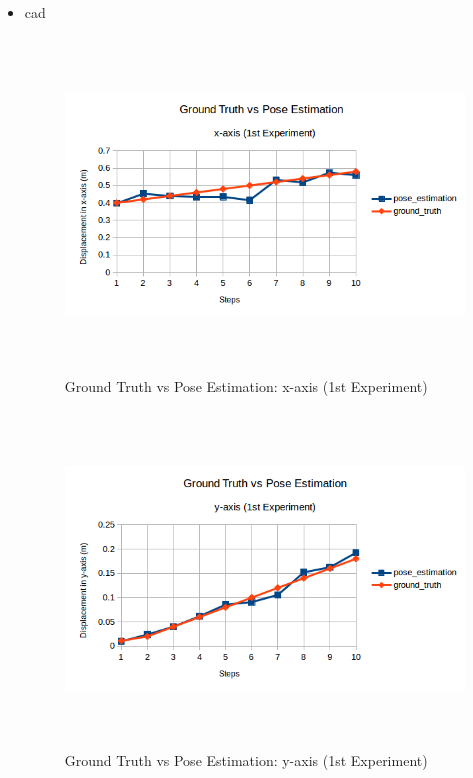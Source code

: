 \begin{itemize}
\item cad

\begin{figure}[!h]
\begin{center}
\includegraphics[width=5in, height=3.5in]{figures05/1_x_validation.png}
\caption{Ground Truth vs Pose Estimation: x-axis (1st Experiment)}
\label{fig:errorx_2nd}
\end{center}
\end{figure}


\begin{figure}[!h]
\begin{center}
\includegraphics[width=5in, height=3.5in]{figures05/1_y_validation.png}
\caption{Ground Truth vs Pose Estimation: y-axis (1st Experiment)}
\label{fig:errory_2nd}
\end{center}
\end{figure}



\end{itemize}
